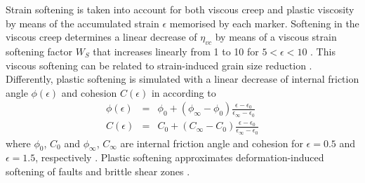 \documentclass[hidelinks,10pt,a4paper]{article}
\begin{document}
Strain softening is taken into account for both viscous creep and plastic viscosity \citep{Huismans2003,Babeyko2005,Huismans2005,Sobolev2005,Warren2008a} by
means of the accumulated strain $\epsilon$ memorised by each marker. Softening in the viscous creep determines a linear decrease of $\eta_{vc}$ by means of a
viscous strain softening factor $W_S$ that increases linearly from 1 to 10 for $5<\epsilon<10$ \citep{Warren2008a}. This viscous softening can be related to
strain-induced grain size reduction \citep{Warren2008a}. Differently, plastic softening is simulated with a linear decrease of internal friction angle
$\phi(\epsilon)$ and cohesion $C(\epsilon)$ in according to
\begin{eqnarray}
\label{eq:friction1}\phi(\epsilon)&=&\phi_0+(\phi_{\infty}-\phi_0)\frac{\epsilon-\epsilon_0}{\epsilon_{\infty}-\epsilon_0}\\
\label{eq:friction2}C(\epsilon)&=&C_0+(C_{\infty}-C_0)\frac{\epsilon-\epsilon_0}{\epsilon_{\infty}-\epsilon_0}
\end{eqnarray}
where $\phi_0$, $C_0$ and $\phi_{\infty}$, $C_{\infty}$ are internal friction angle and cohesion for $\epsilon=0.5$ and $\epsilon=1.5$, respectively
\citep{Huismans2003,Huismans2005,Warren2008a,Thieulot2014}. Plastic softening approximates deformation-induced softening of faults and brittle shear zones
\citep{Warren2008a}.
\end{document}
